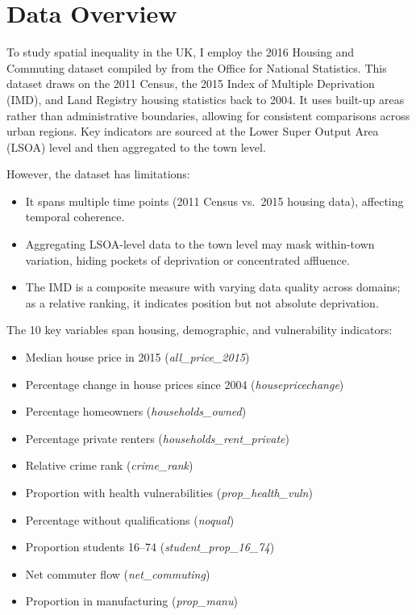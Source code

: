 \documentclass[12pt]{article}
\begin{document}
\section{Data Overview}
To study spatial inequality in the UK, I employ the 2016 Housing and Commuting dataset compiled by \citet{Prothero2016} from the Office for National Statistics. This dataset draws on the 2011 Census, the 2015 Index of Multiple Deprivation (IMD), and Land Registry housing statistics back to 2004. It uses built-up areas rather than administrative boundaries, allowing for consistent comparisons across urban regions. Key indicators are sourced at the Lower Super Output Area (LSOA) level and then aggregated to the town level.

However, the dataset has limitations:
\begin{itemize}
  \item It spans multiple time points (2011 Census vs.\ 2015 housing data), affecting temporal coherence.
  \item Aggregating LSOA-level data to the town level may mask within-town variation, hiding pockets of deprivation or concentrated affluence.
  \item The IMD is a composite measure with varying data quality across domains; as a relative ranking, it indicates position but not absolute deprivation.
\end{itemize}

The 10 key variables span housing, demographic, and vulnerability indicators:
\begin{itemize}
  \item Median house price in 2015 (\textit{all\_price\_2015})
  \item Percentage change in house prices since 2004 (\textit{housepricechange})
  \item Percentage homeowners (\textit{households\_owned})
  \item Percentage private renters (\textit{households\_rent\_private})
  \item Relative crime rank (\textit{crime\_rank})
  \item Proportion with health vulnerabilities (\textit{prop\_health\_vuln})
  \item Percentage without qualifications (\textit{noqual})
  \item Proportion students 16–74 (\textit{student\_prop\_16\_74})
  \item Net commuter flow (\textit{net\_commuting})
  \item Proportion in manufacturing (\textit{prop\_manu})
\end{itemize}
\end{document}
